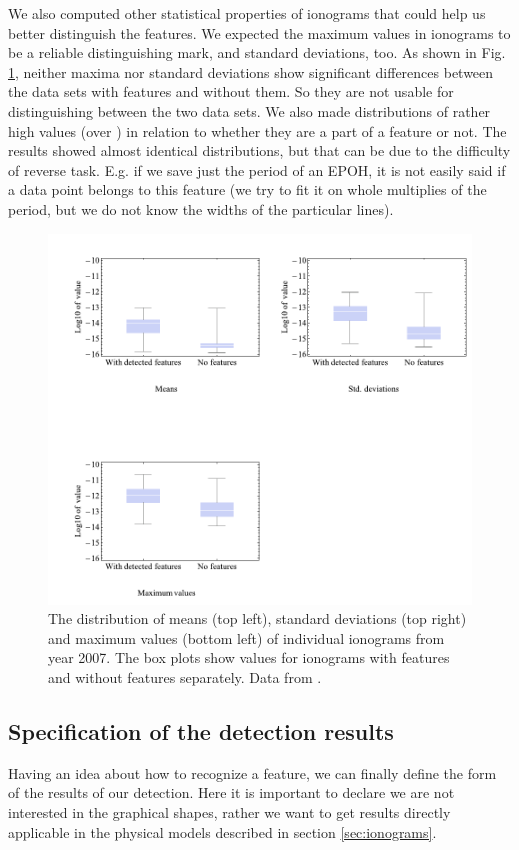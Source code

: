 We also computed other statistical properties of ionograms that could help us better distinguish the features. We expected the maximum values in ionograms to be a reliable distinguishing mark, and standard deviations, too. As shown in Fig. \ref{fig:data_stats}, neither maxima nor standard deviations show significant differences between the data sets with features and without them. So they are not usable for distinguishing between the two data sets. We also made distributions of rather high values (over ) in relation to whether they are a part of a feature or not. The results showed almost identical distributions, but that can be due to the difficulty of reverse task. E.g. if we save just the period of an EPOH, it is not easily said if a data point belongs to this feature (we try to fit it on whole multiplies of the period, but we do not know the widths of the particular lines). 

\begin{figure}
	\centering
	\includegraphics[width=140mm]{images/data_stats.pdf}
	\caption{The distribution of means (top left), standard deviations (top right) and maximum values (bottom left) of individual ionograms from year 2007. The box plots show values for ionograms with features and without features separately. Data from \citep{FTP}.}
	\label{fig:data_stats}
\end{figure}

\subsection{Specification of the detection results}
Having an idea about how to recognize a feature, we can finally define the form of the results of our detection. Here it is important to declare we are not interested in the graphical shapes, rather we want to get results directly applicable in the physical models described in section \ref{sec:ionograms}. 


